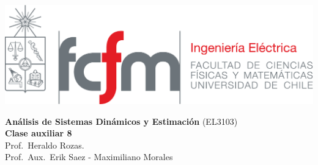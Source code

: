 \documentclass[
  11pt,
  letterpaper,
   addpoints,
   answers
  ]{exam}
\begin{document}
\noindent
\begin{minipage}{0.47\textwidth}
\includegraphics[width=\textwidth]{../fcfm_die}
\end{minipage}
\begin{minipage}{0.53\textwidth}
\begin{center} 
\large\textbf{Análisis de Sistemas Dinámicos y Estimación} (EL3103) \\
\large\textbf{Clase auxiliar 8} \\
\normalsize Prof.~Heraldo Rozas.\\
\normalsize Prof.~Aux.~Erik Saez - Maximiliano Morales
\end{center}
\end{minipage}

\vspace{0.5cm}
\noindent
\vspace{.85cm}
\end{document}
